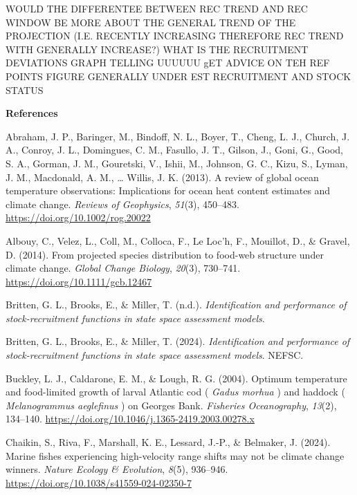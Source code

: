 \documentclass[
  12pt,
]{article}
\newlength{\cslhangindent}
\newenvironment{CSLReferences}[2] %
 {\begin{list}{}{%
  \setlength{\itemindent}{0pt}
  \setlength{\leftmargin}{0pt}
  \setlength{\parsep}{0pt}
  \ifodd #1
   \setlength{\leftmargin}{\cslhangindent}
   \setlength{\itemindent}{-1\cslhangindent}
  \fi
  \setlength{\itemsep}{#2\baselineskip}}}
 {\end{list}}
\begin{document}
WOULD THE DIFFERENTEE BETWEEN REC TREND AND REC WINDOW BE MORE ABOUT THE GENERAL TREND OF THE PROJECTION (I.E. RECENTLY INCREASING THEREFORE REC TREND WITH GENERALLY INCREASE?)
WHAT IS THE RECRUITMENT DEVIATIONS GRAPH TELLING UUUUUU
gET ADVICE ON TEH REF POINTS FIGURE
GENERALLY UNDER EST RECRUITMENT AND STOCK STATUS
\newpage

\textbf{References}

\label{refs}
\begin{CSLReferences}{1}{2}
Abraham, J. P., Baringer, M., Bindoff, N. L., Boyer, T., Cheng, L. J., Church, J. A., Conroy, J. L., Domingues, C. M., Fasullo, J. T., Gilson, J., Goni, G., Good, S. A., Gorman, J. M., Gouretski, V., Ishii, M., Johnson, G. C., Kizu, S., Lyman, J. M., Macdonald, A. M., \ldots{} Willis, J. K. (2013). A review of global ocean temperature observations: Implications for ocean heat content estimates and climate change. \emph{Reviews of Geophysics}, \emph{51}(3), 450--483. \url{https://doi.org/10.1002/rog.20022}

Albouy, C., Velez, L., Coll, M., Colloca, F., Le Loc'h, F., Mouillot, D., \& Gravel, D. (2014). From projected species distribution to food{-}web structure under climate change. \emph{Global Change Biology}, \emph{20}(3), 730--741. \url{https://doi.org/10.1111/gcb.12467}

Britten, G. L., Brooks, E., \& Miller, T. (n.d.). \emph{Identification and performance of stock-recruitment functions in state space assessment models}.

Britten, G. L., Brooks, E., \& Miller, T. (2024). \emph{Identification and performance of stock-recruitment functions in state space assessment models}. NEFSC.

Buckley, L. J., Caldarone, E. M., \& Lough, R. G. (2004). Optimum temperature and food{-}limited growth of larval Atlantic cod ( {\emph{Gadus morhua}} ) and haddock ( {\emph{Melanogrammus aeglefinus}} ) on Georges Bank. \emph{Fisheries Oceanography}, \emph{13}(2), 134--140. \url{https://doi.org/10.1046/j.1365-2419.2003.00278.x}

Chaikin, S., Riva, F., Marshall, K. E., Lessard, J.-P., \& Belmaker, J. (2024). Marine fishes experiencing high-velocity range shifts may not be climate change winners. \emph{Nature Ecology \& Evolution}, \emph{8}(5), 936--946. \url{https://doi.org/10.1038/s41559-024-02350-7}


\end{CSLReferences}
\end{document}
